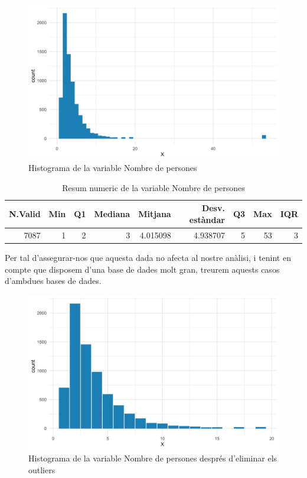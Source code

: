 \documentclass[11pt,longbibliography]{article}
\theoremstyle{definition}
\theoremstyle{remark}
\begin{document}
\begin{figure}[H]
\begin{center}
\includegraphics[width=12.5cm]{Figura1}
\end{center}
\caption{Histograma de la variable Nombre de persones}
\label{fig:F1}
\end{figure}

\begin{table}[H]
\centering
\begin{tabular}{|r|r|r|r|r|r|r|r|r|}
\hline
N.Valid & Min & Q1 & Mediana & Mitjana  & Desv. estàndar & Q3 & Max & IQR \\ \hline
7087    & 1   & 2  & 3       & 4.015098 & 4.938707       & 5  & 53  & 3   \\ \hline
\end{tabular}
\caption{Resum numeric de la variable Nombre de persones}
\label{tab:Fig1-table}
\end{table}


Per tal d'assegurar-nos que aquesta dada no afecta al nostre anàlisi, i tenint en compte que disposem d'una base de dades molt gran, treurem aquests casos d'ambdues bases de dades.


\begin{figure}[H]
\begin{center}
\includegraphics[width=12.5cm]{Figura2}
\end{center}
\caption{Histograma de la variable Nombre de persones després d'eliminar els outliers}
\label{fig:F2}
\end{figure}
\end{document}
